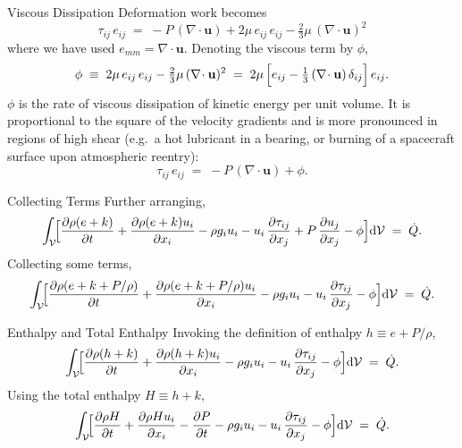 \documentclass[10pt,aspectratio=43]{beamer}
\newcommand{\dd}{\mathrm{d}}
\newcommand{\pd}[2]{\frac{\partial #1}{\partial #2}}
\newcommand{\bu}{\mathbf{u}}
\newcommand{\divg}{\nabla\!\cdot}
\newcommand{\Vol}{\mathcal{V}}
\begin{document}
\begin{frame}{Viscous Dissipation}
  Deformation work becomes
  \[
    \tau_{ij}\,e_{ij} \;=\; -P\,(\divg\bu) + 2\mu\,e_{ij}\,e_{ij} - \tfrac{2}{3}\mu\,(\divg\bu)^{2}
  \]
  where we have used $e_{mm}=\divg\bu$. Denoting the viscous term by $\phi$,
  \[
    \phi \;\equiv\; 2\mu\,e_{ij}\,e_{ij} - \tfrac{2}{3}\mu\,(\divg\bu)^{2}
        \;=\; 2\mu\,\Bigl[e_{ij}-\tfrac{1}{3}\,(\divg\bu)\,\delta_{ij}\Bigr]\,e_{ij}.
  \]
  $\phi$ is the rate of \alert{viscous dissipation} of kinetic energy per
  unit volume. It is proportional to the square of the velocity gradients
  and is more pronounced in regions of high shear (e.g.\ a hot lubricant in
  a bearing, or burning of a spacecraft surface upon atmospheric reentry):
  \[
    \tau_{ij}\,e_{ij} \;=\; -P\,(\divg\bu) + \phi.
  \]
\end{frame}

\begin{frame}{Collecting Terms}
  Further arranging,
  \[
    \int_{\Vol}\!\Bigl[\pd{\rho(e+k)}{t} + \pd{\rho(e+k)u_{i}}{x_{i}}
      - \rho g_{i}u_{i} - u_{i}\,\pd{\tau_{ij}}{x_{j}}
      + P\,\pd{u_{j}}{x_{j}} - \phi\Bigr]\dd\Vol \;=\; \dot{Q}.
  \]
  Collecting some terms,
  \[
    \int_{\Vol}\!\Bigl[\pd{\rho(e+k+P/\rho)}{t} + \pd{\rho(e+k+P/\rho)u_{i}}{x_{i}}
       - \rho g_{i}u_{i} - u_{i}\,\pd{\tau_{ij}}{x_{j}} - \phi\Bigr]\dd\Vol \;=\; \dot{Q}.
  \]
\end{frame}

\begin{frame}{Enthalpy and Total Enthalpy}
  Invoking the definition of enthalpy $h \equiv e + P/\rho$,
  \[
    \int_{\Vol}\!\Bigl[\pd{\rho(h+k)}{t} + \pd{\rho(h+k)u_{i}}{x_{i}}
       - \rho g_{i}u_{i} - u_{i}\,\pd{\tau_{ij}}{x_{j}} - \phi\Bigr]\dd\Vol \;=\; \dot{Q}.
  \]
  Using the total enthalpy $H \equiv h + k$,
  \[
    \int_{\Vol}\!\Bigl[\pd{\rho H}{t} + \pd{\rho H u_{i}}{x_{i}}
       - \pd{P}{t} - \rho g_{i}u_{i} - u_{i}\,\pd{\tau_{ij}}{x_{j}} - \phi\Bigr]\dd\Vol \;=\; \dot{Q}.
  \]
\end{frame}
\end{document}
